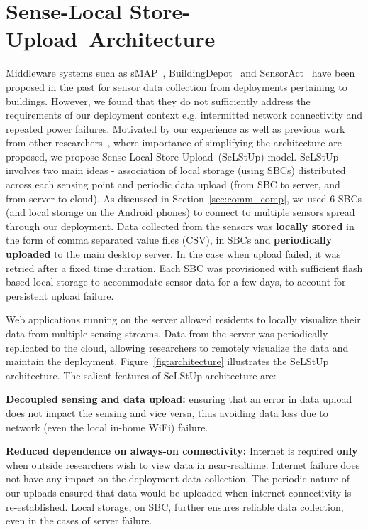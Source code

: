 \documentclass[10pt]{sensys-proc}
\newcommand{\figref}[1]{Figure~\ref{#1}}
\newcommand{\secref}[1]{Section~\ref{#1}}
\newcommand{\selstup}{SeLStUp}
\newcommand{\paradigms}{Sense-Local Store-Upload~}
\newcommand{\selstups}{SeLStUp }
\begin{document}
\section{\paradigms Architecture}	
\label{sec:architecture}
Middleware systems such as sMAP~\cite{smap}, BuildingDepot~\cite{buildingdepot} and SensorAct~\cite{Arjunan12} have been proposed in the past for sensor data collection from deployments pertaining to buildings. However, we found that they do not sufficiently address the requirements of our deployment context e.g. intermitted network connectivity and repeated power failures. Motivated by our experience as well as previous work from other researchers~\cite{hitchhiker_residential}, where importance of simplifying the architecture are proposed, we propose \paradigms (\selstup) model. \selstups involves two main ideas - association of local storage (using SBCs) distributed across each sensing point and periodic data upload (from SBC to server, and from server to cloud). As discussed in \secref{sec:comm_comp}, we used 6 SBCs (and local storage on the Android phones) to connect to multiple sensors spread through our deployment. Data collected from the sensors was \textbf{locally stored} in the form of comma separated value files (CSV), in SBCs and \textbf{periodically uploaded} to the main desktop server. In the case when upload failed, it was retried after a fixed time duration. Each SBC was provisioned with sufficient flash based local storage to accommodate sensor data for a few days, to account for persistent upload failure.

Web applications running on the server allowed residents to locally visualize their data from multiple sensing streams. Data from the server was periodically replicated to the cloud, allowing researchers to remotely visualize the data and maintain the deployment. \figref{fig:architecture} illustrates the \selstups architecture. The salient features of \selstups architecture are:


\noindent \textbf{Decoupled sensing and data upload:} ensuring that an error in data upload does not impact the sensing and vice versa, thus avoiding data loss due to network (even the local in-home WiFi) failure. %

\noindent \textbf{Reduced dependence on always-on connectivity:} Internet is required \textbf{only} when outside researchers wish to view data in near-realtime. Internet failure does not have any impact on the deployment data collection. The periodic nature of our uploads ensured that data would be uploaded when internet connectivity is re-established. Local storage, on SBC, further ensures reliable data collection, even in the cases of server failure. %
\end{document}
